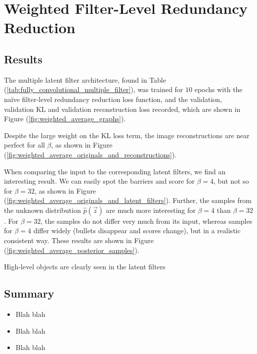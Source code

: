\clearpage
%
%
%
%
%
\section{Weighted Filter-Level Redundancy Reduction}

\subsection{Results}
The multiple latent filter architecture, found in Table (\ref{tab:fully_convolutional_multiple_filter}), was trained for $10$ epochs with the na{\"i}ve filter-level redundancy reduction loss function, and the validation, validation KL and validation reconstruction loss recorded, which are shown in Figure (\ref{fig:weighted_average_graphs}).

Despite the large weight on the KL loss term, the image reconstructions are near perfect for all $\beta$, as shown in Figure (\ref{fig:weighted_average_originals_and_reconstructions}). 

When comparing the input to the corresponding latent filters, we find an interesting result. We can easily spot the barriers and score for $\beta=4$, but not so for $\beta = 32$, as shown in Figure (\ref{fig:weighted_average_originals_and_latent_filters}). Further, the samples from the unknown distribution $\hat{p}(\vec{z})$ are much more interesting for $\beta = 4$ than $\beta = 32$. For $\beta = 32$, the samples do not differ very much from its input, whereas samples for $\beta = 4$ differ widely (bullets disappear and scores change), but in a realistic consistent way. These results are shown in Figure (\ref{fig:weighted_average_posterior_samples}).

High-level objects are clearly seen in the latent filters

\subsection{Summary}

\begin{itemize}
\item Blah blah
\item Blah blah
\item Blah blah
\end{itemize}



